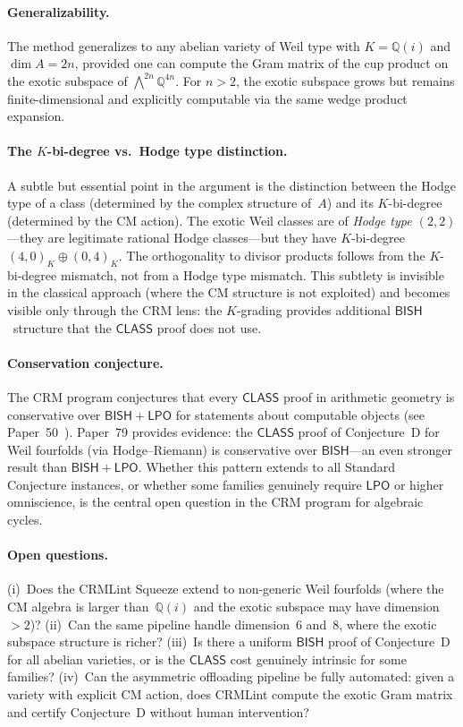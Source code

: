 \documentclass[11pt]{article}
\theoremstyle{plain}
\theoremstyle{definition}
\theoremstyle{remark}
\newcommand{\Q}{\mathbb{Q}}
\newcommand{\BISH}{\mathsf{BISH}}
\newcommand{\LPO}{\mathsf{LPO}}
\newcommand{\CLASS}{\mathsf{CLASS}}
\begin{document}
\paragraph{Generalizability.}
The method generalizes to any abelian variety of Weil type with $K = \Q(i)$
and $\dim A = 2n$, provided one can compute the Gram matrix of the cup
product on the exotic subspace of $\bigwedge^{2n}\Q^{4n}$.  For $n > 2$,
the exotic subspace grows but remains finite-dimensional and explicitly
computable via the same wedge product expansion.

\paragraph{The $K$-bi-degree vs.\ Hodge type distinction.}
A subtle but essential point in the argument is the distinction between
the Hodge type of a class (determined by the complex structure of~$A$) and
its $K$-bi-degree (determined by the CM action).  The exotic Weil classes
are of \emph{Hodge type $(2,2)$}---they are legitimate rational Hodge
classes---but they have $K$-bi-degree $(4,0)_K \oplus (0,4)_K$.  The
orthogonality to divisor products follows from the $K$-bi-degree mismatch,
not from a Hodge type mismatch.  This subtlety is invisible in the
classical approach (where the CM structure is not exploited) and becomes
visible only through the CRM lens: the $K$-grading provides additional
$\BISH$~structure that the $\CLASS$ proof does not use.

\paragraph{Conservation conjecture.}
The CRM program conjectures that every $\CLASS$ proof in arithmetic geometry
is conservative over $\BISH + \LPO$ for statements about computable objects
(see Paper~50~\cite{paper50}).  Paper~79 provides evidence: the $\CLASS$
proof of Conjecture~D for Weil fourfolds (via Hodge--Riemann)
is conservative over $\BISH$---an even stronger result than $\BISH + \LPO$.
Whether this pattern extends to all Standard Conjecture instances, or whether
some families genuinely require $\LPO$ or higher omniscience, is the central
open question in the CRM program for algebraic cycles.

\paragraph{Open questions.}
(i)~Does the CRMLint Squeeze extend to non-generic Weil fourfolds (where
the CM algebra is larger than~$\Q(i)$ and the exotic subspace may have
dimension~$> 2$)?  (ii)~Can the same pipeline handle
dimension~6 and~8, where the exotic subspace structure is richer?
(iii)~Is there a uniform $\BISH$ proof of Conjecture~D for all abelian
varieties, or is the $\CLASS$ cost genuinely intrinsic for some families?
(iv)~Can the asymmetric offloading pipeline be fully automated: given a
variety with explicit CM action, does CRMLint compute the exotic Gram
matrix and certify Conjecture~D without human intervention?
\end{document}
